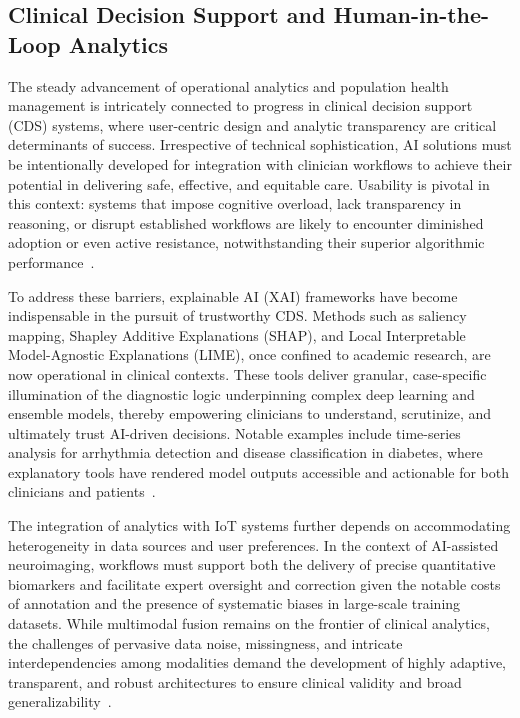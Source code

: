 \subsection{Clinical Decision Support and Human-in-the-Loop Analytics}

The steady advancement of operational analytics and population health management is intricately connected to progress in clinical decision support (CDS) systems, where user-centric design and analytic transparency are critical determinants of success. Irrespective of technical sophistication, AI solutions must be intentionally developed for integration with clinician workflows to achieve their potential in delivering safe, effective, and equitable care. Usability is pivotal in this context: systems that impose cognitive overload, lack transparency in reasoning, or disrupt established workflows are likely to encounter diminished adoption or even active resistance, notwithstanding their superior algorithmic performance~\cite{ref89,ref99}.

To address these barriers, explainable AI (XAI) frameworks have become indispensable in the pursuit of trustworthy CDS. Methods such as saliency mapping, Shapley Additive Explanations (SHAP), and Local Interpretable Model-Agnostic Explanations (LIME), once confined to academic research, are now operational in clinical contexts. These tools deliver granular, case-specific illumination of the diagnostic logic underpinning complex deep learning and ensemble models, thereby empowering clinicians to understand, scrutinize, and ultimately trust AI-driven decisions. Notable examples include time-series analysis for arrhythmia detection and disease classification in diabetes, where explanatory tools have rendered model outputs accessible and actionable for both clinicians and patients~\cite{ref87,ref90}.

The integration of analytics with IoT systems further depends on accommodating heterogeneity in data sources and user preferences. In the context of AI-assisted neuroimaging, workflows must support both the delivery of precise quantitative biomarkers and facilitate expert oversight and correction given the notable costs of annotation and the presence of systematic biases in large-scale training datasets. While multimodal fusion remains on the frontier of clinical analytics, the challenges of pervasive data noise, missingness, and intricate interdependencies among modalities demand the development of highly adaptive, transparent, and robust architectures to ensure clinical validity and broad generalizability~\cite{ref78,ref90}.

